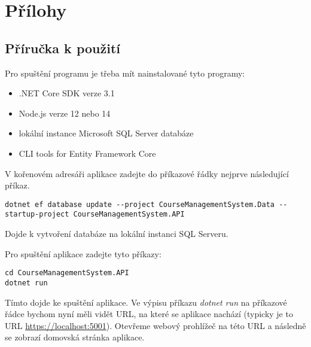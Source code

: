 \documentclass[12pt,a4paper]{report}
\let\openright=\clearpage
\begin{document}
\chapter{Přílohy}

\section{Příručka k použití}

Pro spuštění programu je třeba mít nainstalované tyto programy:
\begin{itemize}
	\item .NET Core SDK verze 3.1
	\item Node.js verze 12 nebo 14
	\item lokální instance Microsoft SQL Server databáze
	\item CLI tools for Entity Framework Core
\end{itemize}

V kořenovém adresáři aplikace zadejte do příkazové řádky nejprve následující příkaz.

\begin{lstlisting}
dotnet ef database update --project CourseManagementSystem.Data --startup-project CourseManagementSystem.API
\end{lstlisting}

Dojde k vytvoření databáze na lokální instanci SQL Serveru.

Pro spuštění aplikace zadejte tyto příkazy:
\begin{lstlisting}
cd CourseManagementSystem.API
dotnet run
\end{lstlisting}

Tímto dojde ke spuštění aplikace. Ve výpisu příkazu \textit{dotnet run} na příkazové řádce bychom nyní měli vidět URL, na které se aplikace nachází (typicky je to URL \url{https://localhost:5001}). Otevřeme webový prohlížeč na této URL a následně se zobrazí domovská stránka aplikace.



\openright
\end{document}
